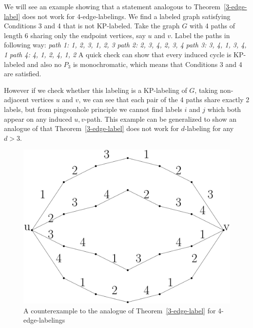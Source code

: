 \documentclass[12pt,a4paper,titlepage,openany]{report}
\begin{document}
\begin{example}
We will see an example showing that a statement analogous to Theorem~\ref{3-edge-label} does not work for 4-edge-labelings. We find a labeled graph satisfying Conditions 3 and 4 that is not KP-labeled.\newline
Take the graph $G$ with 4 paths of length 6 sharing only the endpoint vertices, say $u$ and $v$. Label the paths in following way:\newline
\textit{path 1: 1, 2, 3, 1, 2, 3}\newline
\textit{path 2: 2, 3, 4, 2, 3, 4}\newline
\textit{path 3: 3, 4, 1, 3, 4, 1}\newline
\textit{path 4: 4, 1, 2, 4, 1, 2}\newline
A quick check can show that every induced cycle is KP-labeled and also no $P_3$ is monochromatic, which means that Conditions 3 and 4 are satisfied. 

However if we check whether this labeling is a KP-labeling of $G$, taking non-adjacent vertices $u$ and $v$, we can see that each pair of the 4 paths share exactly 2 labels, but from pingeonhole principle we cannot find labels $i$ and $j$ which both appear on any induced $u, v$-path.\newline
This example can be generalized to show an analogue of that Theorem~\ref{3-edge-label} does not work for $d$-labeling for any $d>3$.  
\begin{figure}[h]
\begin{center}
\includegraphics[width=1\linewidth]{figures/d4.png}
\end{center}
\caption{A counterexample to the analogue of Theorem~\ref{3-edge-label} for 4-edge-labelings}
\end{figure}
\end{example}
\end{document}

